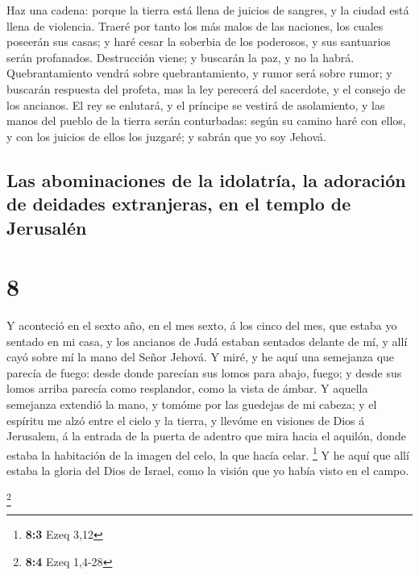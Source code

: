  Haz una cadena: porque la tierra está llena de juicios
de sangres, y la ciudad está llena de violencia.  Traeré
por tanto los más malos de las naciones, los cuales poseerán sus casas;
y haré cesar la soberbia de los poderosos, y sus santuarios serán
profanados.  Destrucción viene; y buscarán la paz, y no
la habrá.  Quebrantamiento vendrá sobre quebrantamiento,
y rumor será sobre rumor; y buscarán respuesta del profeta, mas la ley
perecerá del sacerdote, y el consejo de los ancianos.  El
rey se enlutará, y el príncipe se vestirá de asolamiento, y las manos
del pueblo de la tierra serán conturbadas: según su camino haré con
ellos, y con los juicios de ellos los juzgaré; y sabrán que yo soy
Jehová.

\hypertarget{las-abominaciones-de-la-idolatruxeda-la-adoraciuxf3n-de-deidades-extranjeras-en-el-templo-de-jerusaluxe9n}{%
\subsection{Las abominaciones de la idolatría, la adoración de deidades
extranjeras, en el templo de
Jerusalén}\label{las-abominaciones-de-la-idolatruxeda-la-adoraciuxf3n-de-deidades-extranjeras-en-el-templo-de-jerusaluxe9n}}

\hypertarget{section-7}{%
\section{8}\label{section-7}}

 Y aconteció en el sexto año, en el mes sexto, á los cinco
del mes, que estaba yo sentado en mi casa, y los ancianos de Judá
estaban sentados delante de mí, y allí cayó sobre mí la mano del Señor
Jehová.  Y miré, y he aquí una semejanza que parecía de
fuego: desde donde parecían sus lomos para abajo, fuego; y desde sus
lomos arriba parecía como resplandor, como la vista de ámbar.
 Y aquella semejanza extendió la mano, y tomóme por las
guedejas de mi cabeza; y el espíritu me alzó entre el cielo y la tierra,
y llevóme en visiones de Dios á Jerusalem, á la entrada de la puerta de
adentro que mira hacia el aquilón, donde estaba la habitación de la
imagen del celo, la que hacía celar. \footnote{\textbf{8:3} Ezeq 3,12}
 Y he aquí que allí estaba la gloria del Dios de Israel,
como la visión que yo había visto en el campo.

\footnote{\textbf{8:4} Ezeq 1,4-28}

